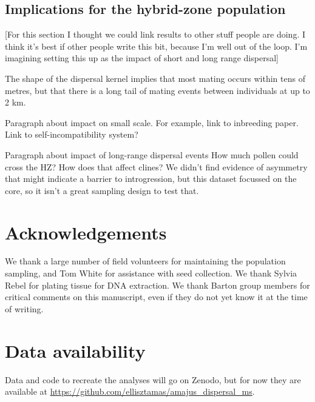 \documentclass[10pt, a4paper, twocolumn]{article} %
\begin{document}
\subsection{Implications for the hybrid-zone population}

[For this section I thought we could link results to other stuff people are doing. I think it's best if other people write this bit, because I'm well out of the loop. I'm imagining setting this up as the impact of short and long range dispersal]

The shape of the dispersal kernel implies that most mating occurs within tens of metres, but that there is a long tail of mating events between individuals at up to 2 km.

Paragraph about impact on small scale.
For example, link to inbreeding paper.
Link to self-incompatibility system?

Paragraph about impact of long-range dispersal events
How much pollen could cross the HZ?
How does that affect clines?
We didn't find evidence of asymmetry that might indicate a barrier to introgression, but this dataset focussed on the core, so it isn't a great sampling design to test that.

\section{Acknowledgements}

We thank a large number of field volunteers for maintaining the population sampling, and Tom White for assistance with seed collection. We thank Sylvia Rebel for plating tissue for DNA extraction.
We thank Barton group members for critical comments on this manuscript, even if they do not yet know it at the time of writing.

\section{Data availability}

Data and code to recreate the analyses will go on Zenodo, but for now they are available at \url{https://github.com/ellisztamas/amajus_dispersal_ms}.


\printbibliography[title={Bibliography}] %

\end{document}
